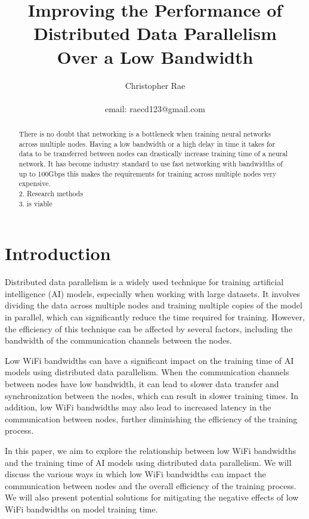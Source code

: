 \documentclass[11pt]{article}
\title{Improving the Performance of Distributed Data Parallelism \\Over a Low Bandwidth}
\author{Christopher Rae \\ \begin{small} email: raecd123@gmail.com \end{small}}
\date{}
\begin{document}
\maketitle


\begin{abstract}
There is no doubt that networking is a bottleneck when training neural networks across multiple nodes. Having a low bandwidth or a high delay in time it takes for data to be transferred between nodes can drastically increase training time of a neural network. It has become industry standard to use fast networking with bandwidths of up to 100Gbps this makes the requirements for training across multiple nodes very expensive. \\
2. Research methods\\
3. is viable
\end{abstract}
\tableofcontents
\newpage

\section{Introduction}
Distributed data parallelism is a widely used technique for training artificial intelligence (AI) models, especially when working with large datasets. It involves dividing the data across multiple nodes and training multiple copies of the model in parallel, which can significantly reduce the time required for training. However, the efficiency of this technique can be affected by several factors, including the bandwidth of the communication channels between the nodes.

Low WiFi bandwidths can have a significant impact on the training time of AI models using distributed data parallelism. When the communication channels between nodes have low bandwidth, it can lead to slower data transfer and synchronization between the nodes, which can result in slower training times. In addition, low WiFi bandwidths may also lead to increased latency in the communication between nodes, further diminishing the efficiency of the training process.

In this paper, we aim to explore the relationship between low WiFi bandwidths and the training time of AI models using distributed data parallelism. We will discuss the various ways in which low WiFi bandwidths can impact the communication between nodes and the overall efficiency of the training process. We will also present potential solutions for mitigating the negative effects of low WiFi bandwidths on model training time.
\end{document}
